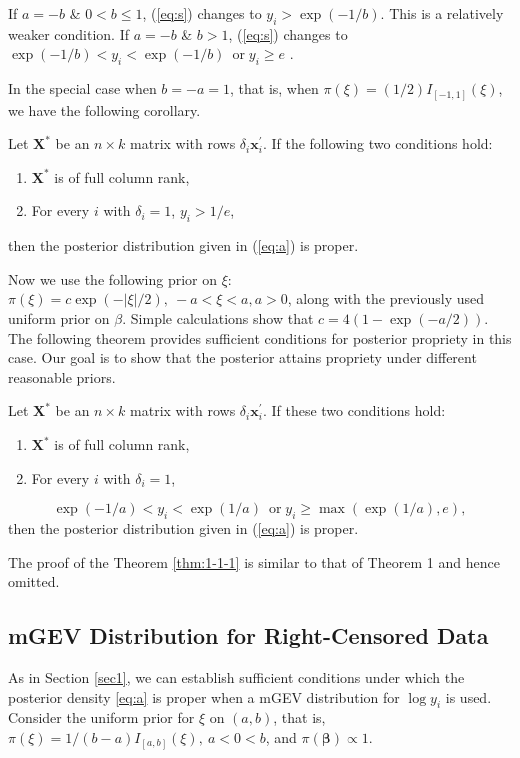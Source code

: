 \documentclass[smallextended]{svjour3}       %
\begin{document}
{\begin{remark}
  If $a=-b$ \& $0<b\leq1$, (\ref{eq:s}) changes to $y_{i}>\exp(- 1/
  b)$.  This is a relatively weaker condition.  If $a=-b$ \& $b>1$,
  (\ref{eq:s}) changes to
  $\exp(-1/b)<y_{i}<\exp(-1/b)\ \;\mbox{or}\;
  y_{i}\geq e$ .
\end{remark}
In the special case when $b=-a=1$, that is, when $\pi(\xi)= (1/2)I_{[-1,1]}(\xi)$, we have the following
corollary.
\begin{corollary}
\label{thm:1}
\noindent
Let $\mathbb{\mathbf{X}}^{*}$ be
an $n\times k$ matrix with rows $\delta_{i}\mathbf{x}_{i}^{\prime}$.
If the following two conditions hold:
\begin{enumerate}
\item $\mathbb{\mathbf{X}}^{*}$ is of full column rank,
\item For every $i$ with $\delta_{i}=1$, $y_{i}> 1/e$,
\end{enumerate}
\noindent
then the posterior distribution given in (\ref{eq:a}) is proper.
\end{corollary}

Now we use the following prior on $\xi$: $\pi(\xi)=c\exp(- |\xi| /2),\
-a< \xi <a, a>0$, along with the previously used uniform prior on
$\beta$. Simple calculations show that $c=4(1-\exp(- a/2))$. The
following theorem provides sufficient conditions for posterior propriety
in this case. Our goal is to show that the posterior attains propriety under
different reasonable priors.
\begin{theorem} \label{thm:1-1-1}
Let $\mathbb{\mathbf{X}}^{*}$ be
an $n\times k$ matrix with rows $\delta_{i}\mathbf{x}_{i}^{\prime}$.
If these two conditions hold:
\begin{enumerate}
\item $\mathbb{\mathbf{X}}^{*}$ is of full column rank,
\item For every $i$ with $\delta_{i}=1$,
\end{enumerate}
\begin{equation}
\exp(-1/a)< y_{i} <\exp(1/a)\ \; \mbox{or} \; y_{i}\geq\max(\exp(1/a), e),\label{eq:s-1}
\end{equation}
then the posterior distribution given in (\ref{eq:a}) is proper.
\end{theorem}
\noindent
The proof of the Theorem \ref{thm:1-1-1} is similar to that of Theorem 1 and hence omitted.

\subsection{mGEV Distribution for Right-Censored Data}
 As in Section \ref{sec1}, we can establish sufficient conditions under which the posterior density \eqref{eq:a} is proper
 when a mGEV distribution for $\log y_{i}$ is used. Consider the uniform
prior for $\xi$ on $(a, b)$, that is, $\pi(\xi)= 1/(b-a) I_{[a,b]}(\xi),\ a<0<b$, and
 $\pi(\mathbf{\beta})\varpropto1$.

}
\end{document}
